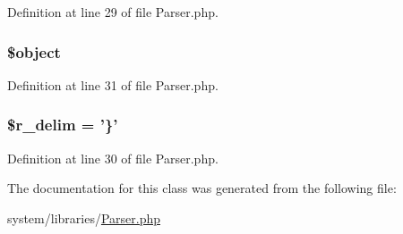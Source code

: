 Definition at line 29 of file Parser.\-php.

\hypertarget{class_c_i___parser_a52123b83a1952a68c5513e47d59ec4a6}{
\subsubsection[{\$object}]{\setlength{\rightskip}{0pt plus 5cm}\$object}}\label{class_c_i___parser_a52123b83a1952a68c5513e47d59ec4a6}


Definition at line 31 of file Parser.\-php.

\hypertarget{class_c_i___parser_a4d80dc6a622989846dbd0e39fde0f3bb}{
\subsubsection[{\$r\-\_\-delim}]{\setlength{\rightskip}{0pt plus 5cm}\$r\-\_\-delim = '\}'}}\label{class_c_i___parser_a4d80dc6a622989846dbd0e39fde0f3bb}


Definition at line 30 of file Parser.\-php.



The documentation for this class was generated from the following file\-:\begin{DoxyCompactItemize}
\item 
system/libraries/\hyperlink{_parser_8php}{Parser.\-php}\end{DoxyCompactItemize}
